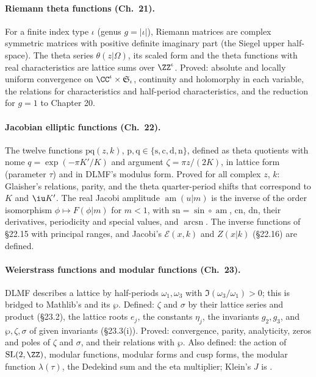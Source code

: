 \documentclass[11pt,a4paper]{article}
\begin{document}
\paragraph{Riemann theta functions (Ch.~21).} For a finite index type $\iota$ (genus
$g=|\iota|$), Riemann matrices are complex symmetric matrices with positive definite imaginary
part (the Siegel upper half-space). The theta series $\theta(z|\Omega)$, its scaled form and the
theta functions with real characteristics are lattice sums over $\ZZ^\iota$. Proved: absolute and
locally uniform convergence on $\CC^\iota\times\mathfrak S_\iota$, continuity and holomorphy in each
variable, the relations for characteristics and half-period characteristics, and the reduction
for $g=1$ to Chapter 20.

\paragraph{Jacobian elliptic functions (Ch.~22).} The twelve functions $\mathrm{pq}(z,k)$,
$\mathrm p,\mathrm q\in\{\mathrm s,\mathrm c,\mathrm d,\mathrm n\}$, defined as theta quotients
with nome $q=\exp(-\pi K'/K)$ and argument $\zeta=\pi z/(2K)$, in lattice form (parameter $\tau$)
and in DLMF's modulus form. Proved for all complex $z$, $k$: Glaisher's relations, parity, and the
theta quarter-period shifts that correspond to $K$ and $\iu K'$. The real Jacobi amplitude
$\operatorname{am}(u|m)$ is the inverse of the order isomorphism $\phi\mapsto F(\phi|m)$ for
$m<1$, with $\mathrm{sn}=\sin\circ\operatorname{am}$, $\mathrm{cn}$, $\mathrm{dn}$, their
derivatives, periodicity and special values, and $\operatorname{arcsn}$. The inverse functions of
\S22.15 with principal ranges, and Jacobi's $\mathcal E(x,k)$ and $Z(x|k)$ (\S22.16) are defined.

\paragraph{Weierstrass functions and modular functions (Ch.~23).} DLMF describes a lattice by
half-periods $\omega_1,\omega_3$ with $\Im(\omega_3/\omega_1)>0$; this is bridged to Mathlib's
 and its $\wp$. Defined: $\zeta$ and $\sigma$ by their lattice series and product
(\S23.2), the lattice roots $e_j$, the constants $\eta_j$, the invariants $g_2,g_3$, and
$\wp,\zeta,\sigma$ of given invariants (\S23.3(i)). Proved: convergence, parity, analyticity, zeros
and poles of $\zeta$ and $\sigma$, and their relations with $\wp$. Also defined: the action of
$\mathrm{SL}(2,\ZZ)$, modular functions, modular forms and cusp forms, the modular function
$\lambda(\tau)$, the Dedekind sum and the eta multiplier; Klein's $J$ is
.
\end{document}
